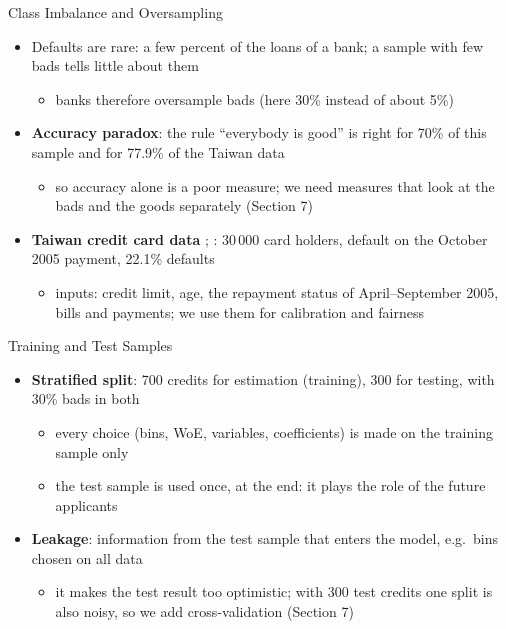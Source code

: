 \begin{frame}{Class Imbalance and Oversampling}
\itemsize{\small}
\begin{itemize}
    \item Defaults are rare: a few percent of the loans of a bank; a sample with few bads tells little about them
    \begin{itemize}
        \item banks therefore oversample bads (here 30\% instead of about 5\%)
    \end{itemize}
    \item \textbf{Accuracy paradox}: the rule ``everybody is good'' is right for 70\% of this sample and for 77.9\% of the Taiwan data
    \begin{itemize}
        \item so accuracy alone is a poor measure; we need measures that look at the bads and the goods separately (Section 7)
    \end{itemize}
    \item \textbf{Taiwan credit card data} ; : 30\,000 card holders, default on the October 2005 payment, 22.1\% defaults
    \begin{itemize}
        \item inputs: credit limit, age, the repayment status of April--September 2005, bills and payments; we use them for calibration and fairness
    \end{itemize}
\end{itemize}
\end{frame}

\begin{frame}{Training and Test Samples}
\itemsize{\small}
\begin{itemize}
    \item \textbf{Stratified split}: 700 credits for estimation (training), 300 for testing, with 30\% bads in both
    \begin{itemize}
        \item every choice (bins, WoE, variables, coefficients) is made on the training sample only
        \item the test sample is used once, at the end: it plays the role of the future applicants
    \end{itemize}
    \item \textbf{Leakage}: information from the test sample that enters the model, e.g.\ bins chosen on all data
    \begin{itemize}
        \item it makes the test result too optimistic; with 300 test credits one split is also noisy, so we add cross-validation (Section 7)
    \end{itemize}
\end{itemize}
\end{frame}


